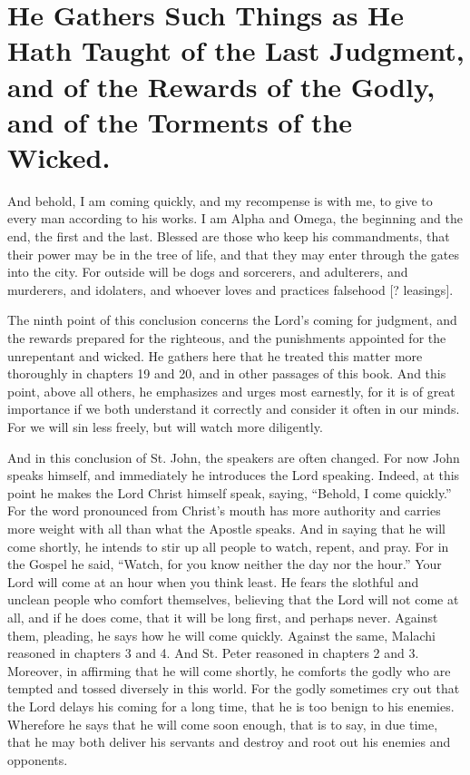 \chapter[Sermon 99. He Gathers Such Things as He Hath Taught of the Last Judgment, and of the Rewards of the Godly, and of the Torments of the Wicked.]{He Gathers Such Things as He Hath Taught of the Last Judgment, and of the Rewards of the Godly, and of the Torments of the Wicked.}
\label{sermon:099}

And behold, I am coming quickly, and my recompense is with me, to give to every man according to his works. I am Alpha and Omega, the beginning and the end, the first and the last. Blessed are those who keep his commandments, that their power may be in the tree of life, and that they may enter through the gates into the city. For outside will be dogs and sorcerers, and adulterers, and murderers, and idolaters, and whoever loves and practices falsehood [? leasings].

The ninth point of this conclusion concerns the Lord’s coming for judgment, and the rewards prepared for the righteous, and the punishments appointed for the unrepentant and wicked. He gathers here that he treated this matter more thoroughly in chapters 19 and 20, and in other passages of this book. And this point, above all others, he emphasizes and urges most earnestly, for it is of great importance if we both understand it correctly and consider it often in our minds. For we will sin less freely, but will watch more diligently.

And in this conclusion of St. John, the speakers are often changed. For now John speaks himself, and immediately he introduces the Lord speaking. Indeed, at this point he makes the Lord Christ himself speak, saying, “Behold, I come quickly.” For the word pronounced from Christ’s mouth has more authority and carries more weight with all than what the Apostle speaks. And in saying that he will come shortly, he intends to stir up all people to watch, repent, and pray. For in the Gospel he said, “Watch, for you know neither the day nor the hour.” Your Lord will come at an hour when you think least. He fears the slothful and unclean people who comfort themselves, believing that the Lord will not come at all, and if he does come, that it will be long first, and perhaps never. Against them, pleading, he says how he will come quickly. Against the same, Malachi reasoned in chapters 3 and 4. And St. Peter reasoned in chapters 2 and 3. Moreover, in affirming that he will come shortly, he comforts the godly who are tempted and tossed diversely in this world. For the godly sometimes cry out that the Lord delays his coming for a long time, that he is too benign to his enemies. Wherefore he says that he will come soon enough, that is to say, in due time, that he may both deliver his servants and destroy and root out his enemies and opponents.

